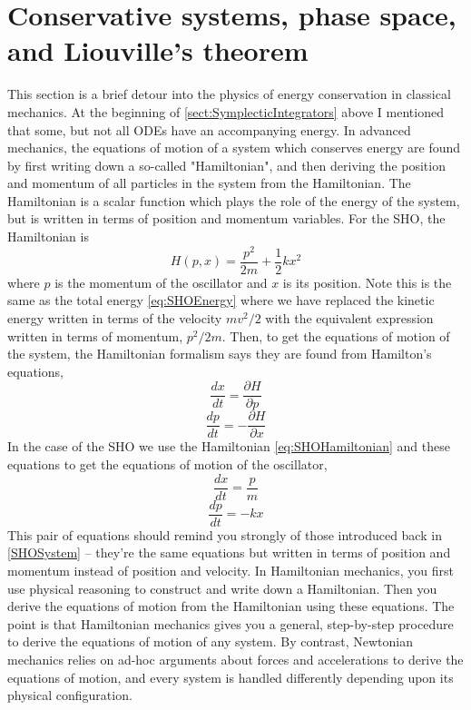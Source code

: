 \documentclass[hidelinks,notitlepage]{book}
\begin{document}
\section{Conservative systems, phase space, and Liouville's theorem}
\label{sect:PhaseSpaceConservation}
This section is a brief detour into the physics of energy conservation in classical mechanics.  At the beginning of \cref{sect:SymplecticIntegrators} above I mentioned that some, but not all ODEs have an accompanying energy.  In advanced mechanics, the equations of motion of a system which conserves energy are found by first writing down a so-called "Hamiltonian", and then deriving the position and momentum of all particles in the system from the Hamiltonian.  The Hamiltonian is a scalar function which plays the role of the energy of the system, but is written in terms of position and momentum variables.  For the SHO, the Hamiltonian is
\begin{equation}
\label{eq:SHOHamiltonian}
H(p,x) = \frac{p^2}{2 m} + \frac{1}{2} k x^2
\end{equation}
where $p$ is the momentum of the oscillator and $x$ is its position.  Note this is the same as the total energy \cref{eq:SHOEnergy} where we have replaced the kinetic energy written in terms of the velocity $m v^2 / 2$ with the equivalent expression written in terms of momentum, $p^2/2 m$.  Then, to get the equations of motion of the system, the Hamiltonian formalism says they are found from Hamilton's equations,
\begin{equation}
\frac{d x}{d t} = \frac{\partial H}{ \partial p} 
\end{equation}
\begin{equation}
\frac{d p}{d t} = -\frac{\partial H}{ \partial x} 
\end{equation}
In the case of the SHO we use the Hamiltonian \cref{eq:SHOHamiltonian} and these equations to get the equations of motion of the oscillator,
\begin{equation}
\nonumber
\frac{d x}{d t} = \frac{p}{m} 
\end{equation}
\begin{equation}
\nonumber
\frac{d p}{d t} = -k x
\end{equation}
This pair of equations should remind you strongly of those introduced back in \cref{SHOSystem} -- they're the same equations but written in terms of position and momentum instead of position and velocity.  In Hamiltonian mechanics, you first use physical reasoning to construct and write down a Hamiltonian.  Then you derive the equations of motion from the Hamiltonian using these equations.  The point is that Hamiltonian mechanics gives you a general, step-by-step procedure to derive the equations of motion of any system.  By contrast, Newtonian mechanics relies on ad-hoc arguments about forces and accelerations to derive the equations of motion, and every system is handled differently depending upon its physical configuration.
\end{document}
